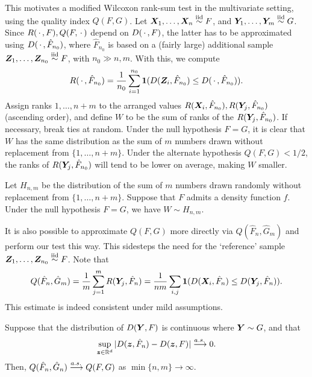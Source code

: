 This motivates a modified Wilcoxon rank-sum test in the multivariate setting,
using the quality index $Q(F, G)$.
Let $\bm{X}_1, \dots, \bm{X}_n \overset{\text{iid}}{\sim} F$, and $\bm{Y}_1, \dots, \bm{Y}_m \overset{\text{iid}}{\sim} G$.
Since $R(\,\cdot\,, F), Q(F, \,\cdot\,)$ depend on $D(\,\cdot\,, F)$, the latter has to be
approximated using $D(\,\cdot\,, \hat{F}_{n_0})$, where $\hat{F}_{n_0}$ is based
on a (fairly large) additional sample $\bm{Z}_1, \dots, \bm{Z}_{n_0} \overset{\text{iid}}{\sim} F$, with
$n_0 \gg n, m$.
With this, we compute
\begin{equation}
    R(\,\cdot\,, \hat{F}_{n_0}) = \frac{1}{n_0} \sum_{i = 1}^{n_0} \bm{1}(D(\bm{Z}_i, \hat{F}_{n_0}) \leq D(\,\cdot\,, \hat{F}_{n_0})).
\end{equation}
Assign ranks $1, \dots, n + m$ to the arranged values $R(\bm{X}_i,
\hat{F}_{n_0}), R(\bm{Y}_j, \hat{F}_{n_0})$ (ascending order), and define $W$ to
be the sum of ranks of the $R(\bm{Y}_j, \hat{F}_{n_0})$.
If necessary, break ties at random.
Under the null hypothesis $F = G$, it is clear that $W$ has the same
distribution as the sum of $m$ numbers drawn without replacement from $\{1,
\dots, n + m\}$.
Under the alternate hypothesis $Q(F, G) < 1/2$, the ranks of $R(\bm{Y}_j,
\hat{F}_{n_0})$ will tend to be lower on average, making $W$ smaller.

\begin{theorem}
    Let $H_{n, m}$ be the distribution of the sum of $m$ numbers drawn
    randomly without replacement from $\{1, \dots, n + m\}$.
    Suppose that $F$ admits a density function $f$.
    Under the null hypothesis $F = G$, we have $W \sim H_{n, m}$.
\end{theorem}

It is also possible to approximate $Q(F, G)$ more directly via $Q(\hat{F}_n,
\hat{G}_m)$ and perform our test this way.
This sidesteps the need for the `reference' sample $\bm{Z}_1, \dots, \bm{Z}_{n_0}
\overset{\text{iid}}{\sim} F$.
Note that
\begin{equation}
    Q(\hat{F}_n, \hat{G}_m)
    = \frac{1}{m}\sum_{j = 1}^m R(\bm{Y}_j, \hat{F}_n)
    = \frac{1}{nm}\sum_{i, j} \bm{1}(D(\bm{X}_i, \hat{F}_n) \leq D(\bm{Y}_j, \hat{F}_n)).
\end{equation}
This estimate is indeed consistent under mild assumptions.

\begin{theorem}
    Suppose that the distribution of $D(\bm{Y}, F)$ is continuous where $\bm{Y} \sim
    G$, and that
    \begin{equation}
        \sup_{\bm{z} \in \mathbb{R}^d} |D(\bm{z}, \hat{F}_n) - D(\bm{z}, F)| \overset{a.s.\,}{\longrightarrow} 0.
    \end{equation}
    Then, $Q(\hat{F}_n, \hat{G}_n) \overset{a.s.\,}{\longrightarrow} Q(F, G)$ as $\min\{n, m\} \to
    \infty$.
\end{theorem}

